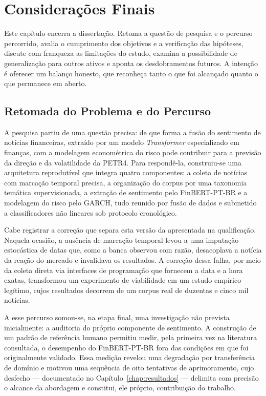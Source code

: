 \chapter{Considerações Finais} \label{chap:conclusao}

Este capítulo encerra a dissertação. Retoma a questão de pesquisa e o percurso percorrido, avalia o cumprimento dos objetivos e a verificação das hipóteses, discute com franqueza as limitações do estudo, examina a possibilidade de generalização para outros ativos e aponta os desdobramentos futuros. A intenção é oferecer um balanço honesto, que reconheça tanto o que foi alcançado quanto o que permanece em aberto.

\section{Retomada do Problema e do Percurso}

A pesquisa partiu de uma questão precisa: de que forma a fusão do sentimento de notícias financeiras, extraído por um modelo \textit{Transformer} especializado em finanças, com a modelagem econométrica do risco pode contribuir para a previsão da direção e da volatilidade da PETR4. Para respondê-la, construiu-se uma arquitetura reprodutível que integra quatro componentes: a coleta de notícias com marcação temporal precisa, a organização do corpus por uma taxonomia temática supervisionada, a extração de sentimento pelo FinBERT-PT-BR e a modelagem do risco pelo GARCH, tudo reunido por fusão de dados e submetido a classificadores não lineares sob protocolo cronológico.

Cabe registrar a correção que separa esta versão da apresentada na qualificação. Naquela ocasião, a ausência de marcação temporal levou a uma imputação estocástica de datas que, como a banca observou com razão, desacoplava a notícia da reação do mercado e invalidava os resultados. A correção dessa falha, por meio da coleta direta via interfaces de programação que fornecem a data e a hora exatas, transformou um experimento de viabilidade em um estudo empírico legítimo, cujos resultados decorrem de um corpus real de duzentas e cinco mil notícias.

A esse percurso somou-se, na etapa final, uma investigação não prevista inicialmente: a auditoria do próprio componente de sentimento. A construção de um padrão de referência humano permitiu medir, pela primeira vez na literatura consultada, o desempenho do FinBERT-PT-BR fora das condições em que foi originalmente validado. Essa medição revelou uma degradação por transferência de domínio e motivou uma sequência de oito tentativas de aprimoramento, cujo desfecho --- documentado no Capítulo~\ref{chap:resultados} --- delimita com precisão o alcance da abordagem e constitui, ele próprio, contribuição do trabalho.

